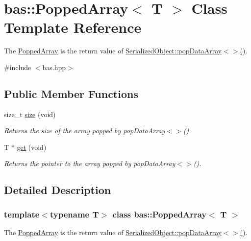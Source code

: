 \hypertarget{classbas_1_1PoppedArray}{}\section{bas\+::Popped\+Array$<$ T $>$ Class Template Reference}
\label{classbas_1_1PoppedArray}


The \mbox{\hyperlink{classbas_1_1PoppedArray}{Popped\+Array}} is the return value of \mbox{\hyperlink{classbas_1_1SerializedObject_a700a5ad3f53a5e12e51321f29e79e422}{Serialized\+Object\+::pop\+Data\+Array$<$$>$()}}.  




{\ttfamily \#include $<$bas.\+hpp$>$}

\subsection*{Public Member Functions}
\begin{DoxyCompactItemize}
\item 
size\+\_\+t \mbox{\hyperlink{classbas_1_1PoppedArray_aeaaba8025e58cc663ac74426e1cde1b0}{size}} (void)
\begin{DoxyCompactList}\small\item\em Returns the size of the array popped by pop\+Data\+Array$<$$>$(). \end{DoxyCompactList}\item 
T $\ast$ \mbox{\hyperlink{classbas_1_1PoppedArray_a964ac49c32df363e64c4720479685036}{get}} (void)
\begin{DoxyCompactList}\small\item\em Returns the pointer to the array popped by pop\+Data\+Array$<$$>$(). \end{DoxyCompactList}\end{DoxyCompactItemize}


\subsection{Detailed Description}
\subsubsection*{template$<$typename T$>$\newline
class bas\+::\+Popped\+Array$<$ T $>$}

The \mbox{\hyperlink{classbas_1_1PoppedArray}{Popped\+Array}} is the return value of \mbox{\hyperlink{classbas_1_1SerializedObject_a700a5ad3f53a5e12e51321f29e79e422}{Serialized\+Object\+::pop\+Data\+Array$<$$>$()}}. 

